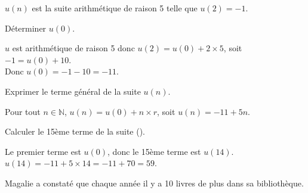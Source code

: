 \documentclass[11pt,a4paper]{article}  %
\begin{document}
$u(n)$ est la suite arithmétique de raison 5 telle que $u(2)=-1$.
\begin{enumMet}
	\item Déterminer $u(0)$.
	\par
	\begin{corrBox}
		$u$ est arithmétique de raison 5 donc $u(2)=u(0)+2\times 5$, soit $-1=u(0)+10$.\\
		Donc $u(0)=-1-10=-11$.
	\end{corrBox}

	\item Exprimer le terme général de la suite $u(n)$.
	\par
	\begin{corrBox}
		Pour tout $n\in\mathbb{N}$, $u(n)=u(0)+n\times r$, soit $u(n)=-11+5n$.
	\end{corrBox}

	\item Calculer le 15ème terme de la suite (\danger).
	\par
	\begin{corrBox}
		Le premier terme est $u(0)$, donc le 15ème terme est $u(14)$.\\
		$u(14)=-11+5\times 14=-11+70=59$.
	\end{corrBox}
\end{enumMet}


Magalie a constaté que chaque année il y a 10 livres de plus dans sa bibliothèque.
\end{document}
